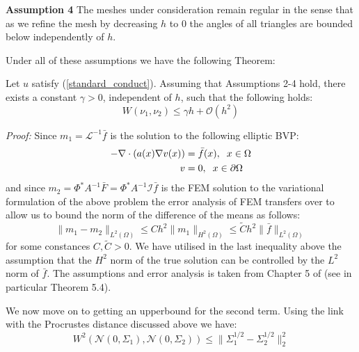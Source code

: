\noindent \textbf{Assumption 4 } The meshes under consideration remain regular in the sense that as we refine the mesh by decreasing $h$ to 0 the angles of all triangles are bounded below independently of $h$.

Under all of these assumptions we have the following Theorem:
\vspace{5pt}

\begin{theorem}
    \label{prior_distance_bound}
    Let $u$ satisfy (\ref{standard_conduct}). Assuming that Assumptions 2-4 hold, there exists a constant $\gamma>0$, independent of $h$, such that the following holds:
    \begin{equation}
        \label{bound_on_distance}
        W(\nu_{1},\nu_{2})\leq \gamma h +\mathcal{O}(h^2)
    \end{equation}
\end{theorem}

\noindent \textit{Proof:} Since $m_1=\mathcal{L}^{-1}\bar{f}$ is the solution to the following elliptic BVP:
\begin{align*}
    -\nabla\cdot(a(x)\nabla v(x)) &= \bar{f}(x), \hspace{0.2cm} x\in\Omega \\
    v &= 0, \hspace{0.2cm} x\in\partial\Omega
\end{align*}
and since $m_2=\Phi^{*}A^{-1}\bar{F}=\Phi^{*}A^{-1}\mathcal{I}\bar{f}$ is the FEM solution to the variational formulation of the above problem the error analysis of FEM transfers over to allow us to bound the norm of the difference of the means as follows:
\begin{equation}
    \label{bound_on_diff_means}
    \|m_1-m_2\|_{L^{2}(\Omega)}\leq Ch^{2}\|m_{1}\|_{H^{2}(\Omega)}\leq\tilde{C}h^{2}\|\bar{f}\|_{L^{2}(\Omega)}
\end{equation}
for some constances $C,\tilde{C}>0$. We have utilised in the last inequality above the assumption that the $H^2$ norm of the true solution can be controlled by the $L^2$ norm of $\bar{f}$. The assumptions and error analysis is taken from Chapter 5 of \textcolor{blue}{\citep{larsson2008partial}} (see in particular Theorem 5.4).

We now move on to getting an upperbound for the second term. Using the link with the Procrustes distance discussed above we have:
\begin{equation}
    W^2(\mathcal{N}(0,\Sigma_1),\mathcal{N}(0,\Sigma_2))\leq\|\Sigma_{1}^{1/2}-\Sigma_{2}^{1/2}\|_{2}^{2}
\end{equation}

